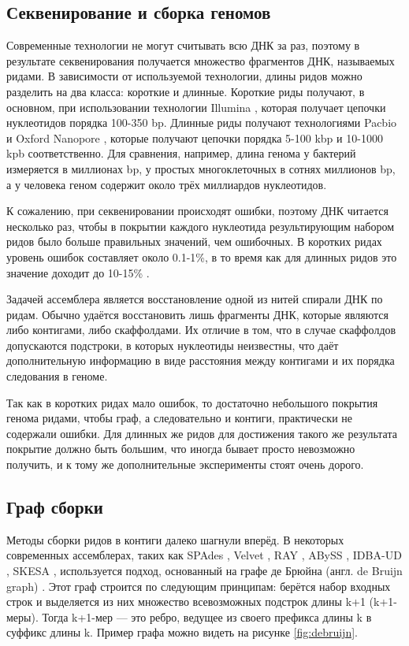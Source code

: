 \documentclass[14pt]{matmex-diploma-custom}
\begin{document}
\subsection{Секвенирование и сборка геномов}
Современные технологии не могут считывать всю ДНК за раз, поэтому в результате секвенирования получается множество фрагментов ДНК, называемых ридами. В зависимости от используемой технологии, длины ридов можно разделить на два класса: короткие и длинные. Короткие риды получают, в основном, при использовании технологии Illumina \cite{art:reads}, которая получает цепочки нуклеотидов порядка 100-350 bp. Длинные риды получают технологиями Pacbio и Oxford Nanopore \cite{art:reads}, которые получают цепочки порядка 5-100 kbp и 10-1000 kpb соответственно. Для сравнения, например, длина генома у бактерий измеряется в миллионах bp, у простых многоклеточных в сотнях миллионов bp, а у человека геном содержит около трёх миллиардов нуклеотидов.

К сожалению, при секвенировании происходят ошибки, поэтому ДНК читается несколько раз, чтобы в покрытии каждого нуклеотида результирующим набором ридов было больше правильных значений, чем ошибочных. В коротких ридах уровень ошибок составляет около 0.1-1\%, в то время как для длинных ридов это значение доходит до 10-15\% \cite{art:reads}.

Задачей ассемблера является восстановление одной из нитей спирали ДНК по ридам. Обычно удаётся  восстановить лишь фрагменты ДНК, которые являются либо контигами, либо скаффолдами. Их отличие в том, что в случае скаффолдов допускаются подстроки, в которых нуклеотиды неизвестны, что даёт дополнительную информацию в виде расстояния между контигами и их порядка следования в геноме.

Так как в коротких ридах мало ошибок, то достаточно небольшого покрытия генома ридами, чтобы граф, а следовательно и контиги, практически не содержали ошибки. Для длинных же ридов для достижения такого же результата покрытие должно быть большим, что иногда бывает просто невозможно получить, и к тому же дополнительные эксперименты стоят очень дорого.

\subsection{Граф сборки}
Методы сборки ридов в контиги далеко шагнули вперёд. В некоторых современных ассемблерах, таких как SPAdes \cite{art:SPAdes}, Velvet \cite{art:zerbino2008velvet}, RAY \cite{art:boisvert2010ray}, ABySS \cite{art:simpson2009abyss}, IDBA-UD \cite{art:peng2012idba}, SKESA \cite{art:souvorov2018skesa}, используется подход, основанный на графе де Брюйна (англ. de Bruijn graph) \cite{art:Pevzner}. Этот граф строится по следующим принципам: берётся набор входных строк и выделяется из них множество всевозможных подстрок длины k+1 (k+1-меры). Тогда k+1-мер --- это ребро, ведущее из своего префикса длины k в суффикс длины k. Пример графа можно видеть на рисунке \ref{fig:debruijn}.
\end{document}
